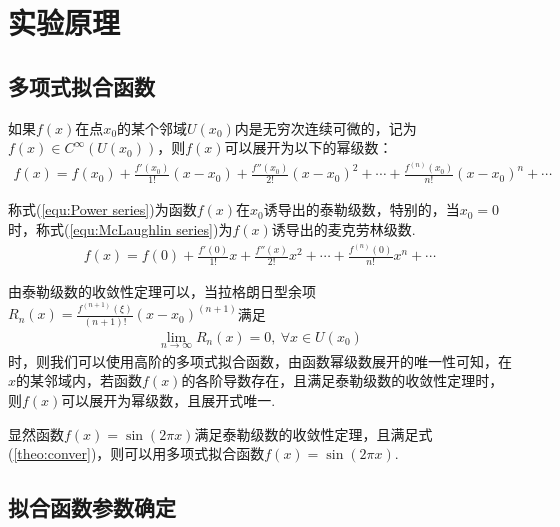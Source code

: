 \documentclass{hitreport}
\begin{document}
\section{实验原理}

\subsection{多项式拟合函数}
如果$f\left( x\right) $在点$x_0$的某个邻域$U\left(x_0\right)$内是无穷次连续可微的，记为$f\left( x \right)\in C^{\infty}\left( U \left( x_0 \right)\right)$，则$f\left( x\right) $可以展开为以下的幂级数：
\begin{align}\label{equ:Power series}
f\left( x \right) =f\left( x_0 \right) +\frac{f'\left( x_0 \right)}{1!}\left( x-x_0 \right) +\frac{f''\left( x_0 \right)}{2!}\left( x-x_0 \right) ^2+\cdots +\frac{f^{\left( n \right)}\left( x_0 \right)}{n!}\left( x-x_0 \right) ^n+\cdots
\end{align}

称式(\ref{equ:Power series})为函数$f\left(x\right)$在$x_0$诱导出的泰勒级数，特别的，当$x_0=0$时，称式(\ref{equ:McLaughlin series})为$f\left(x\right)$诱导出的麦克劳林级数.
\begin{align}\label{equ:McLaughlin series}
f\left( x \right) =f\left( 0 \right) +\frac{f'\left( 0 \right)}{1!}x +\frac{f''\left( x \right)}{2!}x^2+\cdots +\frac{f^{\left( n \right)}\left( 0 \right)}{n!}x^n+\cdots
\end{align}

由泰勒级数的收敛性定理可以，当拉格朗日型余项$R_n\left( x \right) =\frac{f^{\left( n+1 \right)}\left( \xi \right)}{\left( n+1 \right) !}\left( x-x_0 \right) ^{\left( n+1 \right)}$满足
\begin{align}\label{theo:conver}
\underset{n\rightarrow \infty}{\lim}R_n\left( x \right) =0,\ \forall x\in U\left( x_0 \right) 
\end{align}
时，则我们可以使用高阶的多项式拟合函数，由函数幂级数展开的唯一性可知，在$x$的某邻域内，若函数$f\left(x\right)$的各阶导数存在，且满足泰勒级数的收敛性定理时，则$f\left(x\right)$可以展开为幂级数，且展开式唯一.

显然函数$f\left(x\right) = \sin \left(2\pi x \right) $满足泰勒级数的收敛性定理，且满足式(\ref{theo:conver})，则可以用多项式拟合函数$f\left(x\right) = \sin \left(2 \pi x\right)$.

\subsection{拟合函数参数确定}
\end{document}
